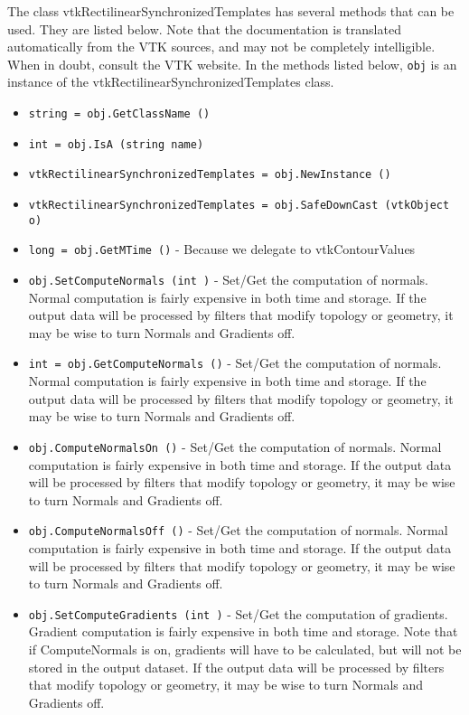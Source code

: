 The class vtkRectilinearSynchronizedTemplates has several methods that can be used.
  They are listed below.
Note that the documentation is translated automatically from the VTK sources,
and may not be completely intelligible.  When in doubt, consult the VTK website.
In the methods listed below, \verb|obj| is an instance of the vtkRectilinearSynchronizedTemplates class.
\begin{itemize}
\item  \verb|string = obj.GetClassName ()|

\item  \verb|int = obj.IsA (string name)|

\item  \verb|vtkRectilinearSynchronizedTemplates = obj.NewInstance ()|

\item  \verb|vtkRectilinearSynchronizedTemplates = obj.SafeDownCast (vtkObject o)|

\item  \verb|long = obj.GetMTime ()| -  Because we delegate to vtkContourValues

\item  \verb|obj.SetComputeNormals (int )| -  Set/Get the computation of normals. Normal computation is fairly
 expensive in both time and storage. If the output data will be
 processed by filters that modify topology or geometry, it may be
 wise to turn Normals and Gradients off.

\item  \verb|int = obj.GetComputeNormals ()| -  Set/Get the computation of normals. Normal computation is fairly
 expensive in both time and storage. If the output data will be
 processed by filters that modify topology or geometry, it may be
 wise to turn Normals and Gradients off.

\item  \verb|obj.ComputeNormalsOn ()| -  Set/Get the computation of normals. Normal computation is fairly
 expensive in both time and storage. If the output data will be
 processed by filters that modify topology or geometry, it may be
 wise to turn Normals and Gradients off.

\item  \verb|obj.ComputeNormalsOff ()| -  Set/Get the computation of normals. Normal computation is fairly
 expensive in both time and storage. If the output data will be
 processed by filters that modify topology or geometry, it may be
 wise to turn Normals and Gradients off.

\item  \verb|obj.SetComputeGradients (int )| -  Set/Get the computation of gradients. Gradient computation is
 fairly expensive in both time and storage. Note that if
 ComputeNormals is on, gradients will have to be calculated, but
 will not be stored in the output dataset.  If the output data
 will be processed by filters that modify topology or geometry, it
 may be wise to turn Normals and Gradients off.


\end{itemize}
